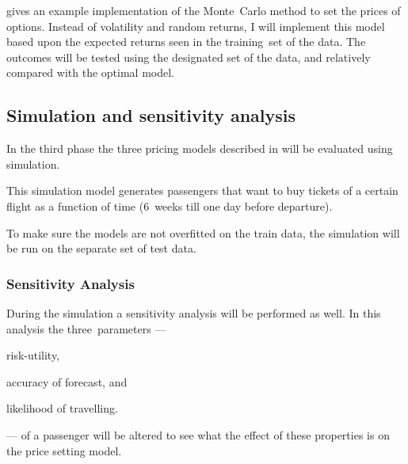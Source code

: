  gives an example implementation of the Monte~Carlo method to set the prices of options. Instead of volatility and random returns, I will implement this model based upon the expected returns seen in the training~set of the data. The outcomes will be tested using the designated set of the data, and relatively compared with the optimal model.


\subsection{Simulation and sensitivity analysis}
\label{subsec:SimulationAndSensitivityAnalysis}
In the third phase the three pricing models described in  will be evaluated using simulation.

This simulation model generates passengers that want to buy tickets of a certain flight as a function of time (6~weeks till one day before departure). 

To make sure the models are not overfitted on the train data, the simulation will be run on the separate set of test data.

\subsubsection{Sensitivity Analysis}
During the simulation a sensitivity analysis will be performed as well. In this analysis the three~parameters --- \begin{inparaenum}
\item risk-utility,
\item accuracy of forecast, and
\item likelihood of travelling.
\end{inparaenum} --- of a passenger will be altered to see what the effect of these properties is on the price setting model.

